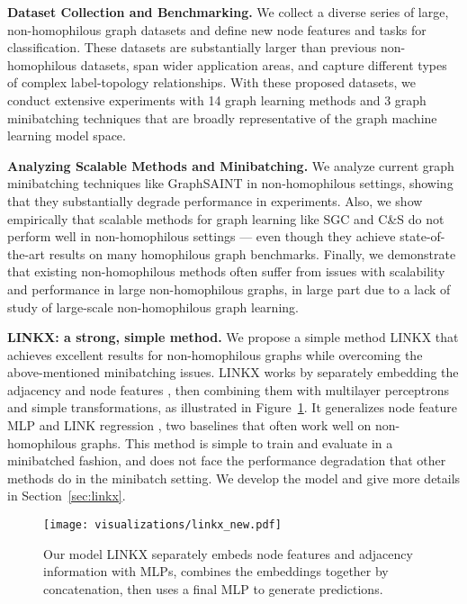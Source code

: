 \documentclass{article}
\begin{document}
\textbf{Dataset Collection and Benchmarking.} We collect a diverse series of large, non-homophilous graph datasets and define new node features and tasks for classification. These datasets are substantially larger than previous non-homophilous datasets, span wider application areas, and capture different types of complex label-topology relationships. 
With these proposed datasets, we conduct extensive experiments with 14 graph learning methods and 3 graph minibatching techniques that are broadly representative of the graph machine learning model space.

\textbf{Analyzing Scalable Methods and Minibatching.}
We analyze current graph minibatching techniques like GraphSAINT \cite{zeng2019graphsaint} in non-homophilous settings, showing that they substantially degrade performance in experiments.
Also, we show empirically that scalable methods for graph learning like SGC and C\&S \cite{wu2019simplifying, huang2021combining} do not perform well in non-homophilous settings --- even though they achieve state-of-the-art results on many homophilous graph benchmarks. Finally, we demonstrate that existing non-homophilous methods often suffer from issues with scalability and performance in large non-homophilous graphs, in large part due to a lack of study of large-scale non-homophilous graph learning.

\textbf{LINKX: a strong, simple method.} We propose a simple method LINKX that achieves excellent results for non-homophilous graphs while overcoming the above-mentioned minibatching issues. LINKX works by separately embedding the adjacency  and node features , then combining them with multilayer perceptrons and simple transformations, as illustrated in Figure~\ref{fig:linkx}. It generalizes node feature MLP and LINK regression \cite{zheleva2009to}, two baselines that often work well on non-homophilous graphs. This method is simple to train and evaluate in a minibatched fashion, and does not face the performance degradation that other methods do in the minibatch setting. We develop the model and give more details in Section~\ref{sec:linkx}.

\begin{figure}[ht]
    \centering
    \texttt{[image: visualizations/linkx\_new.pdf]}
    \caption{Our model LINKX separately embeds node features and adjacency information with MLPs, combines the embeddings together by concatenation, then uses a final MLP to generate predictions.}
    \label{fig:linkx}
    \vspace{-10pt}
\end{figure}
\end{document}
